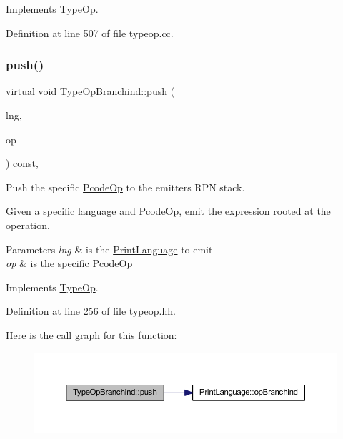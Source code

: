 Implements \mbox{\hyperlink{class_type_op_a60717e486917a30cc7cb6e3ce02585e1}{Type\+Op}}.



Definition at line 507 of file typeop.\+cc.

\mbox{\label{class_type_op_branchind_aca034f61b2717d8865fd7bf8cb71a5f3}} 
\subsubsection{\texorpdfstring{push()}{push()}}
{\footnotesize\ttfamily virtual void Type\+Op\+Branchind\+::push (\begin{DoxyParamCaption}\item[{\mbox{\hyperlink{class_print_language}{Print\+Language}} $\ast$}]{lng,  }\item[{const \mbox{\hyperlink{class_pcode_op}{Pcode\+Op}} $\ast$}]{op }\end{DoxyParamCaption}) const\hspace{0.3cm}{\ttfamily [inline]}, {\ttfamily [virtual]}}



Push the specific \mbox{\hyperlink{class_pcode_op}{Pcode\+Op}} to the emitter\textquotesingle{}s R\+PN stack. 

Given a specific language and \mbox{\hyperlink{class_pcode_op}{Pcode\+Op}}, emit the expression rooted at the operation. 
\begin{DoxyParams}{Parameters}
{\em lng} & is the \mbox{\hyperlink{class_print_language}{Print\+Language}} to emit \\
\hline
{\em op} & is the specific \mbox{\hyperlink{class_pcode_op}{Pcode\+Op}} \\
\hline
\end{DoxyParams}


Implements \mbox{\hyperlink{class_type_op_ac9c9544203ed74dabe6ac662b653b2af}{Type\+Op}}.



Definition at line 256 of file typeop.\+hh.

Here is the call graph for this function\+:
\nopagebreak
\begin{figure}[H]
\begin{center}
\leavevmode
\includegraphics[width=350pt]{class_type_op_branchind_aca034f61b2717d8865fd7bf8cb71a5f3_cgraph}
\end{center}
\end{figure}


